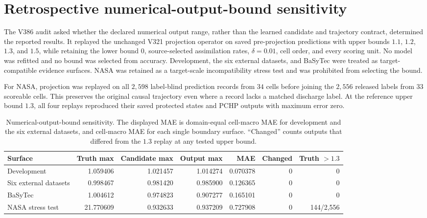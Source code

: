 \documentclass[11pt]{article}
\begin{document}
\section{Retrospective numerical-output-bound sensitivity}

The V386 audit asked whether the declared numerical output range, rather than the learned candidate and trajectory contract, determined the reported results. It replayed the unchanged V321 projection operator on saved pre-projection predictions with upper bounds $1.1$, $1.2$, $1.3$, and $1.5$, while retaining the lower bound $0$, source-selected assimilation rates, $\delta=0.01$, cell order, and every scoring unit. No model was refitted and no bound was selected from accuracy. Development, the six external datasets, and BaSyTec were treated as target-compatible evidence surfaces. NASA was retained as a target-scale incompatibility stress test and was prohibited from selecting the bound.

For NASA, projection was replayed on all $2{,}598$ label-blind prediction records from $34$ cells before joining the $2{,}556$ released labels from $33$ scoreable cells. This preserves the original causal trajectory even where a record lacks a matched discharge label. At the reference upper bound $1.3$, all four replays reproduced their saved protected states and PCHP outputs with maximum error zero.

\begin{table}[H]
\centering
\caption{Numerical-output-bound sensitivity. The displayed MAE is domain-equal cell-macro MAE for development and the six external datasets, and cell-macro MAE for each single boundary surface. ``Changed'' counts outputs that differed from the $1.3$ replay at any tested upper bound.}
\label{tab:output_bound_sensitivity}
\small
\setlength{\tabcolsep}{4.5pt}
\begin{tabular}{lrrrrrr}
\toprule
Surface & Truth max & Candidate max & Output max & MAE & Changed & Truth $>1.3$ \\
\midrule
Development & 1.059406 & 1.021457 & 1.014274 & 0.070378 & 0 & 0 \\
Six external datasets & 0.998467 & 0.981420 & 0.985900 & 0.126365 & 0 & 0 \\
BaSyTec & 1.004612 & 0.974823 & 0.907277 & 0.165101 & 0 & 0 \\
NASA stress test & 21.770609 & 0.932633 & 0.937209 & 0.727908 & 0 & 144/2,556 \\
\bottomrule
\end{tabular}
\end{table}
\end{document}
